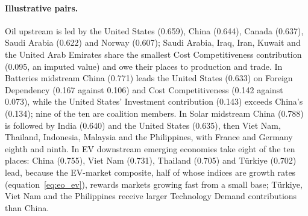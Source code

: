 \paragraph{Illustrative pairs.} Oil upstream is led by the United States (0.659), China (0.644),
Canada (0.637), Saudi Arabia (0.622) and Norway (0.607); Saudi Arabia, Iraq, Iran, Kuwait and the
United Arab Emirates share the smallest Cost Competitiveness contribution (0.095, an imputed value)
and owe their places to production and trade. In Batteries midstream China (0.771) leads the United
States (0.633) on Foreign Dependency (0.167 against 0.106) and Cost Competitiveness (0.142 against
0.073), while the United States' Investment contribution (0.143) exceeds China's (0.134); nine of
the ten are coalition members. In Solar midstream China (0.788) is followed by India (0.640) and
the United States (0.635), then Viet Nam, Thailand, Indonesia, Malaysia and the Philippines, with
France and Germany eighth and ninth. In EV downstream emerging economies take eight of the ten
places: China (0.755), Viet Nam (0.731), Thailand (0.705) and T\"urkiye (0.702) lead, because the
EV-market composite, half of whose indices are growth rates (equation~\eqref{eq:eo_ev}), rewards
markets growing fast from a small base; T\"urkiye, Viet Nam and the Philippines receive larger
Technology Demand contributions than China.
